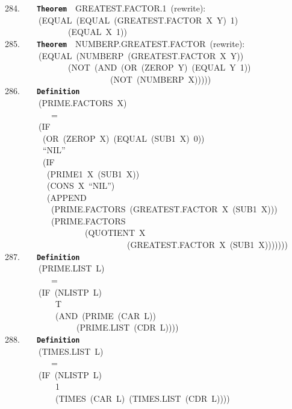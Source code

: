 \documentclass[11pt]{book}
\newenvironment{pubasis}{\begin{flushleft}\ttfamily\small}{\normalsize\rmfamily\end{flushleft}}
\newcommand{\axiomordefinition}[1]{\vspace{6pt}\texttt{\textbf{#1}}}
\begin{document}
\begin{pubasis}
284.~~~~\axiomordefinition{Theorem}~~GREAT\-EST.FAC\-TOR.1~(rewrite):\\
~~~~~~~~(EQUAL~(EQUAL~(GREAT\-EST.FAC\-TOR~X~Y)~1)\\
~~~~~~~~~~~~~~~(EQUAL~X~1))\\

285.~~~~\axiomordefinition{Theorem}~~NUMBERP.GREAT\-EST.FAC\-TOR~(rewrite):\\
~~~~~~~~(EQUAL~(NUMBERP~(GREAT\-EST.FAC\-TOR~X~Y))\\
~~~~~~~~~~~~~~~(NOT~(AND~(OR~(ZEROP~Y)~(EQUAL~Y~1))\\
~~~~~~~~~~~~~~~~~~~~~~~~~(NOT~(NUMBERP~X)))))\\

286.~~~~\axiomordefinition{Definition}\\
~~~~~~~~(PRIME.FAC\-TORS~X)\\
~~~~~~~~~~~=\\
~~~~~~~~(IF\\
~~~~~~~~~(OR~(ZEROP~X)~(EQUAL~(SUB1~X)~0))\\
~~~~~~~~~``NIL''\\
~~~~~~~~~(IF\\
~~~~~~~~~~(PRIME1~X~(SUB1~X))\\
~~~~~~~~~~(CONS~X~``NIL'')\\
~~~~~~~~~~(APPEND\\
~~~~~~~~~~~(PRIME.FAC\-TORS~(GREAT\-EST.FAC\-TOR~X~(SUB1~X)))\\
~~~~~~~~~~~(PRIME.FAC\-TORS\\
~~~~~~~~~~~~~~~~~~~(QUOTIENT~X\\
~~~~~~~~~~~~~~~~~~~~~~~~~~~~~(GREAT\-EST.FAC\-TOR~X~(SUB1~X)))))))\\

287.~~~~\axiomordefinition{Definition}\\
~~~~~~~~(PRIME.LIST~L)\\
~~~~~~~~~~~=\\
~~~~~~~~(IF~(NLISTP~L)\\
~~~~~~~~~~~~T\\
~~~~~~~~~~~~(AND~(PRIME~(CAR~L))\\
~~~~~~~~~~~~~~~~~(PRIME.LIST~(CDR~L))))\\

288.~~~~\axiomordefinition{Definition}\\
~~~~~~~~(TIMES.LIST~L)\\
~~~~~~~~~~~=\\
~~~~~~~~(IF~(NLISTP~L)\\
~~~~~~~~~~~~1\\
~~~~~~~~~~~~(TIMES~(CAR~L)~(TIMES.LIST~(CDR~L))))\\


\end{pubasis}
\end{document}
